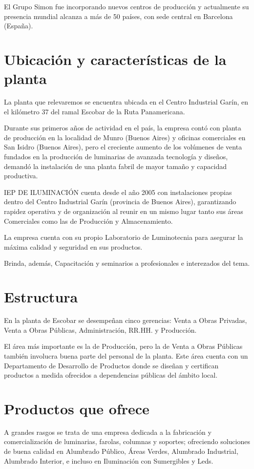 \documentclass[12pt,titlepage]{article}
\begin{document}
El Grupo Simon fue incorporando nuevos centros de producci\'on y actualmente su presencia mundial alcanza a m\'as de 50 pa\'ises, con sede central en Barcelona (Espa\~na).

\section{Ubicaci\'on y caracter\'isticas de la planta}
La planta que relevaremos se encuentra ubicada en el Centro Industrial Gar\'in, en el kil\'ometro 37 del ramal Escobar de la Ruta Panamericana.

Durante sus primeros a\~nos de actividad en el pa\'is, la empresa cont\'o con planta de producci\'on en la localidad de Munro (Buenos Aires) y oficinas comerciales en San Isidro (Buenos Aires), pero el creciente aumento de los vol\'umenes de venta fundados en la producci\'on de luminarias de avanzada tecnolog\'ia y dise\~nos, demand\'o la instalaci\'on de una planta fabril de mayor tama\~no y capacidad productiva.

IEP DE ILUMINACI\'ON cuenta desde el a\~no 2005 con instalaciones propias dentro del Centro Industrial Gar\'in (provincia de Buenos Aires), garantizando rapidez operativa y de organizaci\'on al reunir en un mismo lugar tanto sus \'areas Comerciales como las de Producci\'on y Almacenamiento.

La empresa cuenta con su propio Laboratorio de Luminotecnia para asegurar la m\'axima calidad y seguridad en sus productos.

Brinda, adem\'as, Capacitaci\'on y seminarios a profesionales e interezados del tema.

\section{Estructura}
En la planta de Escobar se desempe\~nan cinco gerencias: Venta a Obras Privadas, Venta a Obras P\'ublicas, Administraci\'on, RR.HH. y Producci\'on.

El \'area m\'as importante es la de Producci\'on, pero la de Venta a Obras P\'ublicas tambi\'en involucra buena parte del personal de la planta. Este \'area cuenta con un Departamento de Desarrollo de Productos donde se dise\~nan y certifican productos a medida ofrecidos a dependencias p\'ublicas del \'ambito local.

\section{Productos que ofrece}
A grandes rasgos se trata de una empresa dedicada a la fabricaci\'on y comercializaci\'on de luminarias, farolas, columnas y soportes; ofreciendo soluciones de buena calidad en Alumbrado P\'ublico, \'Areas Verdes, Alumbrado Industrial, Alumbrado Interior, e incluso en Iluminaci\'on con Sumergibles y Leds.
\end{document}
